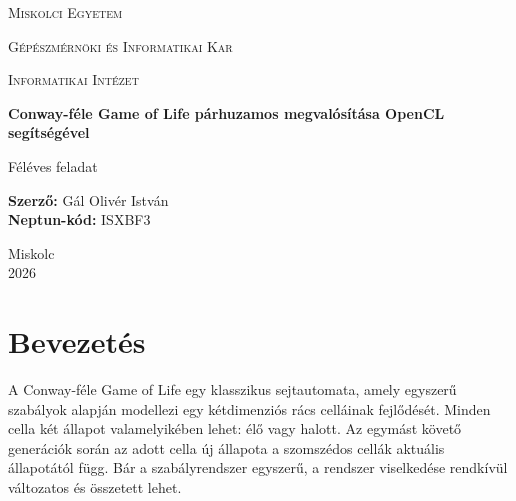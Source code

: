\documentclass[12pt,a4paper]{article}
\begin{document}
\begin{titlepage}
    \centering
    
    {\scshape\LARGE Miskolci Egyetem \par}
    \vspace{0.5cm}
    {\scshape\Large Gépészmérnöki és Informatikai Kar \par}
    \vspace{0.5cm}
    {\scshape\large Informatikai Intézet \par}
    
    \vspace{2.5cm}
    
    {\Huge\bfseries Conway-féle Game of Life párhuzamos megvalósítása OpenCL segítségével\par}
    
    \vspace{2cm}
    
    {\Large Féléves feladat\par}
    
    \vfill
    
    \begin{flushleft}
        \large
        \textbf{Szerző:} Gál Olivér István \\
        \textbf{Neptun-kód:} ISXBF3
    \end{flushleft}
    
    \vspace{1cm}
    
    \begin{flushright}
        \large
        Miskolc \\
        2026
    \end{flushright}
    
\end{titlepage}

\tableofcontents
\newpage

\section{Bevezetés}

A Conway-féle Game of Life egy klasszikus sejtautomata, amely egyszerű szabályok alapján modellezi egy kétdimenziós rács celláinak fejlődését. Minden cella két állapot valamelyikében lehet: élő vagy halott. Az egymást követő generációk során az adott cella új állapota a szomszédos cellák aktuális állapotától függ. Bár a szabályrendszer egyszerű, a rendszer viselkedése rendkívül változatos és összetett lehet.
\end{document}
